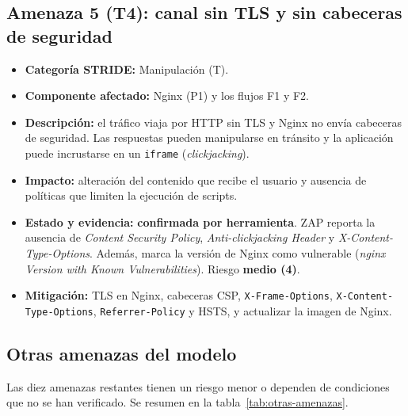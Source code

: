 
\subsection{Amenaza 5 (T4): canal sin TLS y sin cabeceras de seguridad}

\begin{itemize}
    \item \textbf{Categoría STRIDE:} Manipulación (T).
    \item \textbf{Componente afectado:} Nginx (P1) y los flujos F1 y F2.
    \item \textbf{Descripción:} el tráfico viaja por HTTP sin TLS y Nginx no
    envía cabeceras de seguridad. Las respuestas pueden manipularse en
    tránsito y la aplicación puede incrustarse en un \texttt{iframe}
    (\textit{clickjacking}).
    \item \textbf{Impacto:} alteración del contenido que recibe el usuario y
    ausencia de políticas que limiten la ejecución de scripts.
    \item \textbf{Estado y evidencia:} \textbf{confirmada por herramienta}.
    ZAP reporta la ausencia de \textit{Content Security Policy},
    \textit{Anti-clickjacking Header} y \textit{X-Content-Type-Options}.
    Además, marca la versión de Nginx como vulnerable
    (\textit{nginx Version with Known Vulnerabilities}). Riesgo \textbf{medio
    (4)}.
    \item \textbf{Mitigación:} TLS en Nginx, cabeceras CSP,
    \texttt{X-Frame-Options}, \texttt{X-Content-Type-Options},
    \texttt{Referrer-Policy} y HSTS, y actualizar la imagen de Nginx.
\end{itemize}

\subsection{Otras amenazas del modelo}

Las diez amenazas restantes tienen un riesgo menor o dependen de
condiciones que no se han verificado. Se resumen en la
tabla~\ref{tab:otras-amenazas}.

